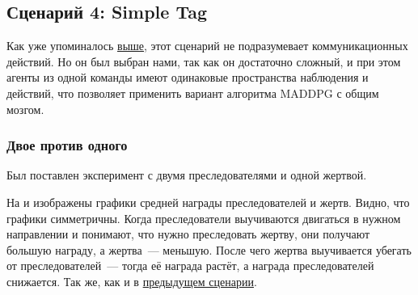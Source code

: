 \subsection{Сценарий 4: Simple Tag}

Как уже упоминалось \hyperref[exp-st]{выше}, этот сценарий не подразумевает коммуникационных действий. Но он был выбран нами, так как он достаточно сложный, и при этом агенты из одной команды имеют одинаковые пространства наблюдения и действий, что позволяет применить вариант алгоритма MADDPG с общим мозгом.

\subsubsection{Двое против одного}

Был поставлен эксперимент с двумя преследователями и одной жертвой.

На  и  изображены графики средней награды преследователей и жертв. Видно, что графики симметричны. Когда преследователи выучиваются двигаться в нужном направлении и понимают, что нужно преследовать жертву, они получают большую награду, а жертва~--- меньшую. После чего жертва выучивается убегать от преследователей~--- тогда её награда растёт, а награда преследователей снижается. Так же, как и в \hyperref[exp-results-svc]{предыдущем сценарии}.

